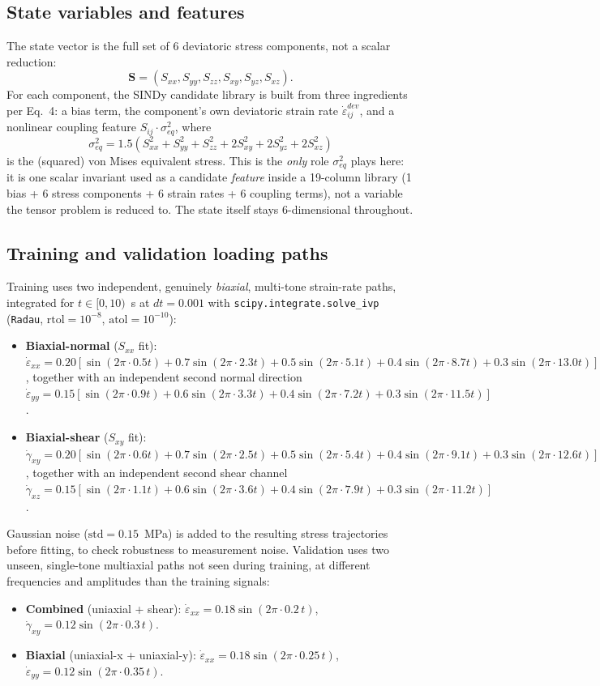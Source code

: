 \documentclass{article}
\begin{document}
\subsection{State variables and features}
The state vector is the full set of 6 deviatoric stress components, not a scalar reduction:
\[
    \mathbf{S} = (S_{xx}, S_{yy}, S_{zz}, S_{xy}, S_{yz}, S_{xz}).
\]
For each component, the SINDy candidate library is built from three ingredients per Eq.~4: a bias term, the component's own deviatoric strain rate $\dot{\varepsilon}^{dev}_{ij}$, and a nonlinear coupling feature $S_{ij}\cdot\sigma_{eq}^2$, where
\[
    \sigma_{eq}^2 = 1.5\left(S_{xx}^2 + S_{yy}^2 + S_{zz}^2 + 2S_{xy}^2 + 2S_{yz}^2 + 2S_{xz}^2\right)
\]
is the (squared) von Mises equivalent stress. This is the \emph{only} role $\sigma_{eq}^2$ plays here: it is one scalar invariant used as a candidate \emph{feature} inside a 19-column library (1 bias + 6 stress components + 6 strain rates + 6 coupling terms), not a variable the tensor problem is reduced to. The state itself stays 6-dimensional throughout.

\subsection{Training and validation loading paths}
\label{sec:3d-signals}
Training uses two independent, genuinely \emph{biaxial}, multi-tone strain-rate paths, integrated for $t\in[0,10)$~s at $dt=0.001$ with \texttt{scipy.integrate.solve\_ivp} (\texttt{Radau}, $\text{rtol}=10^{-8}$, $\text{atol}=10^{-10}$):
\begin{itemize}
    \item \textbf{Biaxial-normal} ($S_{xx}$ fit): $\dot\varepsilon_{xx} = 0.20\left[\sin(2\pi\cdot 0.5t) + 0.7\sin(2\pi\cdot 2.3t) + 0.5\sin(2\pi\cdot 5.1t) + 0.4\sin(2\pi\cdot 8.7t) + 0.3\sin(2\pi\cdot 13.0t)\right]$, together with an independent second normal direction $\dot\varepsilon_{yy} = 0.15\left[\sin(2\pi\cdot 0.9t) + 0.6\sin(2\pi\cdot 3.3t) + 0.4\sin(2\pi\cdot 7.2t) + 0.3\sin(2\pi\cdot 11.5t)\right]$.
    \item \textbf{Biaxial-shear} ($S_{xy}$ fit): $\dot\gamma_{xy} = 0.20\left[\sin(2\pi\cdot 0.6t) + 0.7\sin(2\pi\cdot 2.5t) + 0.5\sin(2\pi\cdot 5.4t) + 0.4\sin(2\pi\cdot 9.1t) + 0.3\sin(2\pi\cdot 12.6t)\right]$, together with an independent second shear channel $\dot\gamma_{xz} = 0.15\left[\sin(2\pi\cdot 1.1t) + 0.6\sin(2\pi\cdot 3.6t) + 0.4\sin(2\pi\cdot 7.9t) + 0.3\sin(2\pi\cdot 11.2t)\right]$.
\end{itemize}
Gaussian noise ($\text{std}=0.15$~MPa) is added to the resulting stress trajectories before fitting, to check robustness to measurement noise. Validation uses two unseen, single-tone multiaxial paths not seen during training, at different frequencies and amplitudes than the training signals:
\begin{itemize}
    \item \textbf{Combined} (uniaxial + shear): $\dot\varepsilon_{xx} = 0.18\sin(2\pi\cdot 0.2\,t)$, $\dot\gamma_{xy} = 0.12\sin(2\pi\cdot 0.3\,t)$.
    \item \textbf{Biaxial} (uniaxial-x + uniaxial-y): $\dot\varepsilon_{xx} = 0.18\sin(2\pi\cdot 0.25\,t)$, $\dot\varepsilon_{yy} = 0.12\sin(2\pi\cdot 0.35\,t)$.
\end{itemize}
\end{document}
